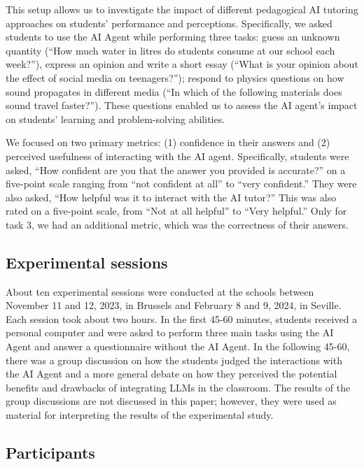 \documentclass[
  11pt,
]{article}
\begin{document}
This setup allows us to investigate the impact of different pedagogical AI tutoring approaches on students' performance and perceptions. Specifically, we asked students to use the AI Agent while performing three tasks: guess an unknown quantity (``How much water in litres do students consume at our school each week?''), express an opinion and write a short essay (``What is your opinion about the effect of social media on teenagers?''); respond to physics questions on how sound propagates in different media (``In which of the following materials does sound travel faster?''). These questions enabled us to assess the AI agent's impact on students' learning and problem-solving abilities.

We focused on two primary metrics: (1) confidence in their answers and (2) perceived usefulness of interacting with the AI agent. Specifically, students were asked, ``How confident are you that the answer you provided is accurate?'' on a five-point scale ranging from ``not confident at all'' to ``very confident.'' They were also asked, ``How helpful was it to interact with the AI tutor?'' This was also rated on a five-point scale, from ``Not at all helpful'' to ``Very helpful.'' Only for task 3, we had an additional metric, which was the correctness of their answers.

\subsection{Experimental sessions}\label{experimental-sessions}

About ten experimental sessions were conducted at the schools between November 11 and 12, 2023, in Brussels and February 8 and 9, 2024, in Seville. Each session took about two hours. In the first 45-60 minutes, students received a personal computer and were asked to perform three main tasks using the AI Agent and answer a questionnaire without the AI Agent. In the following 45-60, there was a group discussion on how the students judged the interactions with the AI Agent and a more general debate on how they perceived the potential benefits and drawbacks of integrating LLMs in the classroom. The results of the group discussions are not discussed in this paper; however, they were used as material for interpreting the results of the experimental study.

\subsection{Participants}\label{participants}
\end{document}
